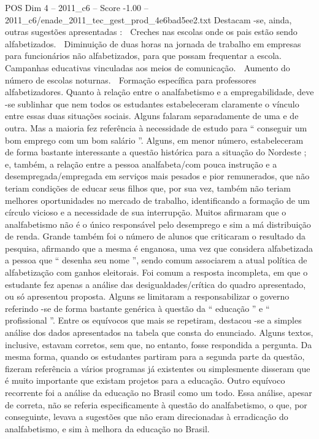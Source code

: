 \begin{textsample}{POS Dim 4 – 2011\_c6 – Score -1.00 – 2011\_c6/enade\_2011\_tec\_gest\_prod\_4e6bad5ee2.txt}
Destacam -se, ainda, outras sugestões apresentadas :  Creches nas escolas onde os pais estão sendo alfabetizados.  Diminuição de duas horas na jornada de trabalho em empresas para funcionários não alfabetizados, para que possam frequentar a escola.  Campanhas educativas vinculadas aos meios de comunicação.  Aumento do número de escolas noturnas.  Formação específica para professores alfabetizadores.
Quanto à relação entre o analfabetismo e a empregabilidade, deve -se sublinhar que nem todos os estudantes estabeleceram claramente o vínculo entre essas duas situações sociais.
Alguns falaram separadamente de uma e de outra.
Mas a maioria fez referência à necessidade de estudo para “ conseguir um bom emprego com um bom salário ”.
Alguns, em menor número, estabeleceram de forma bastante interessante a questão histórica para a situação do Nordeste ; e, também, a relação entre a pessoa analfabeta/com pouca instrução e a desempregada/empregada em serviços mais pesados e pior remunerados, que não teriam condições de educar seus filhos que, por sua vez, também não teriam melhores oportunidades no mercado de trabalho, identificando a formação de um círculo vicioso e a necessidade de sua interrupção.
Muitos afirmaram que o analfabetismo não é o único responsável pelo desemprego e sim a má distribuição de renda.
Grande também foi o número de alunos que criticaram o resultado da pesquisa, afirmando que a mesma é enganosa, uma vez que considera alfabetizada a pessoa que “ desenha seu nome ”, sendo comum associarem a atual política de alfabetização com ganhos eleitorais.
Foi comum a resposta incompleta, em que o estudante fez apenas a análise das desigualdades/crítica do quadro apresentado, ou só apresentou proposta.
Alguns se limitaram a responsabilizar o governo referindo -se de forma bastante genérica à questão da “ educação ” e “ profissional ”.
Entre os equívocos que mais se repetiram, destacou -se a simples análise dos dados apresentados na tabela que consta do enunciado.
Alguns textos, inclusive, estavam corretos, sem que, no entanto, fosse respondida a pergunta.
Da mesma forma, quando os estudantes partiram para a segunda parte da questão, fizeram referência a vários programas já existentes ou simplesmente disseram que é muito importante que existam projetos para a educação.
Outro equívoco recorrente foi a análise da educação no Brasil como um todo.
Essa análise, apesar de correta, não se referia especificamente à questão do analfabetismo, o que, por conseguinte, levava a sugestões que não eram direcionadas à erradicação do analfabetismo, e sim à melhora da educação no Brasil.

\end{textsample}
